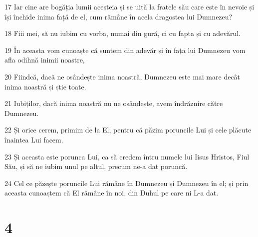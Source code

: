 \par 17 Iar cine are bogăția lumii acesteia și se uită la fratele său care este în nevoie și își închide inima față de el, cum rămâne în acela dragostea lui Dumnezeu?
\par 18 Fiii mei, să nu iubim cu vorba, numai din gură, ci cu fapta și cu adevărul.
\par 19 În aceasta vom cunoaște că suntem din adevăr și în fața lui Dumnezeu vom afla odihnă inimii noastre,
\par 20 Fiindcă, dacă ne osândește inima noastră, Dumnezeu este mai mare decât inima noastră și știe toate.
\par 21 Iubiților, dacă inima noastră nu ne osândește, avem îndrăznire către Dumnezeu.
\par 22 Și orice cerem, primim de la El, pentru că păzim poruncile Lui și cele plăcute înaintea Lui facem.
\par 23 Și aceasta este porunca Lui, ca să credem întru numele lui Iisus Hristos, Fiul Său, și să ne iubim unul pe altul, precum ne-a dat poruncă.
\par 24 Cel ce păzește poruncile Lui rămâne în Dumnezeu și Dumnezeu în el; și prin aceasta cunoaștem că El rămâne în noi, din Duhul pe care ni L-a dat.

\chapter{4}

